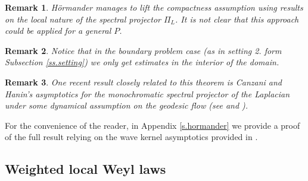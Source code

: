 \documentclass[10pt,twoside]{article}
\numberwithin{theorem}{section}
\newtheorem{remark}{Remark}
\begin{document}
\begin{remark}
H\"ormander manages to lift the compactness assumption using results on the local nature of the spectral projector $\Pi_L$. It is not clear that this approach could be applied for a general $P$.
\end{remark}
\begin{remark}
Notice that in the boundary problem case (as in setting 2. form Subsection \ref{ss.setting}) we only get estimates in the interior of the domain.
\end{remark}
\begin{remark}
One recent result closely related to this theorem is Canzani and Hanin's asymptotics for the monochromatic spectral projector of the Laplacian under some dynamical assumption on the geodesic flow (see \cite{caha151} and \cite{caha16}).
\end{remark}
For the convenience of the reader, in Appendix \ref{s.hormander} we provide a proof of the full result relying on the wave kernel asymptotics provided in \cite{ho68}.\\

\subsection{Weighted local Weyl laws}\label{ss.wlwl}
\end{document}
